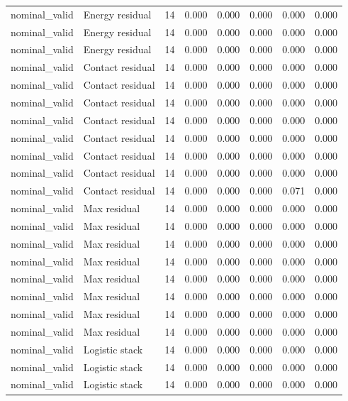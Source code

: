 {\begin{longtable}{llrrrrrr}
nominal\_valid & Energy residual & 14 & 0.000 & 0.000 & 0.000 & 0.000 & 0.000 \\
nominal\_valid & Energy residual & 14 & 0.000 & 0.000 & 0.000 & 0.000 & 0.000 \\
nominal\_valid & Energy residual & 14 & 0.000 & 0.000 & 0.000 & 0.000 & 0.000 \\
nominal\_valid & Contact residual & 14 & 0.000 & 0.000 & 0.000 & 0.000 & 0.000 \\
nominal\_valid & Contact residual & 14 & 0.000 & 0.000 & 0.000 & 0.000 & 0.000 \\
nominal\_valid & Contact residual & 14 & 0.000 & 0.000 & 0.000 & 0.000 & 0.000 \\
nominal\_valid & Contact residual & 14 & 0.000 & 0.000 & 0.000 & 0.000 & 0.000 \\
nominal\_valid & Contact residual & 14 & 0.000 & 0.000 & 0.000 & 0.000 & 0.000 \\
nominal\_valid & Contact residual & 14 & 0.000 & 0.000 & 0.000 & 0.000 & 0.000 \\
nominal\_valid & Contact residual & 14 & 0.000 & 0.000 & 0.000 & 0.000 & 0.000 \\
nominal\_valid & Contact residual & 14 & 0.000 & 0.000 & 0.000 & 0.071 & 0.000 \\
nominal\_valid & Max residual & 14 & 0.000 & 0.000 & 0.000 & 0.000 & 0.000 \\
nominal\_valid & Max residual & 14 & 0.000 & 0.000 & 0.000 & 0.000 & 0.000 \\
nominal\_valid & Max residual & 14 & 0.000 & 0.000 & 0.000 & 0.000 & 0.000 \\
nominal\_valid & Max residual & 14 & 0.000 & 0.000 & 0.000 & 0.000 & 0.000 \\
nominal\_valid & Max residual & 14 & 0.000 & 0.000 & 0.000 & 0.000 & 0.000 \\
nominal\_valid & Max residual & 14 & 0.000 & 0.000 & 0.000 & 0.000 & 0.000 \\
nominal\_valid & Max residual & 14 & 0.000 & 0.000 & 0.000 & 0.000 & 0.000 \\
nominal\_valid & Max residual & 14 & 0.000 & 0.000 & 0.000 & 0.000 & 0.000 \\
nominal\_valid & Logistic stack & 14 & 0.000 & 0.000 & 0.000 & 0.000 & 0.000 \\
nominal\_valid & Logistic stack & 14 & 0.000 & 0.000 & 0.000 & 0.000 & 0.000 \\
nominal\_valid & Logistic stack & 14 & 0.000 & 0.000 & 0.000 & 0.000 & 0.000 \\

\end{longtable}}
